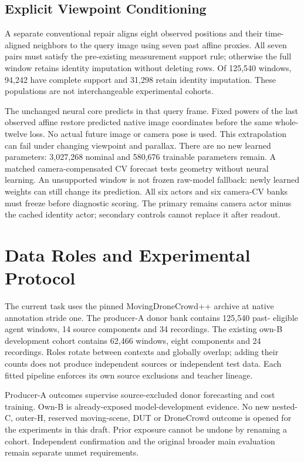 \documentclass[10pt,twocolumn,letterpaper]{article}
\begin{document}
\subsection{Explicit Viewpoint Conditioning}

A separate conventional repair aligns eight observed positions and their time-aligned neighbors to the query image using seven past affine proxies. All seven pairs must satisfy the pre-existing measurement support rule; otherwise the full window retains identity imputation without deleting rows. Of 125,540 windows, 94,242 have complete support and 31,298 retain identity imputation. These populations are not interchangeable experimental cohorts.


The unchanged neural core predicts in that query frame. Fixed powers of the last observed affine restore predicted native image coordinates before the same whole-twelve loss. No actual future image or camera pose is used. This extrapolation can fail under changing viewpoint and parallax. There are no new learned parameters: 3,027,268 nominal and 580,676 trainable parameters remain. A matched camera-compensated CV forecast tests geometry without neural learning. An unsupported window is not frozen raw-model fallback: newly learned weights can still change its prediction. All six actors and six camera-CV banks must freeze before diagnostic scoring. The primary remains camera actor minus the cached identity actor; secondary controls cannot replace it after readout.


\section{Data Roles and Experimental Protocol}

The current task uses the pinned MovingDroneCrowd++ archive at native annotation stride one. The producer-A donor bank contains 125,540 past- eligible agent windows, 14 source components and 34 recordings. The existing own-B development cohort contains 62,466 windows, eight components and 24 recordings. Roles rotate between contexts and globally overlap; adding their counts does not produce independent sources or independent test data. Each fitted pipeline enforces its own source exclusions and teacher lineage.


Producer-A outcomes supervise source-excluded donor forecasting and cost training. Own-B is already-exposed model-development evidence. No new nested-C, outer-H, reserved moving-scene, DUT or DroneCrowd outcome is opened for the experiments in this draft. Prior exposure cannot be undone by renaming a cohort. Independent confirmation and the original broader main evaluation remain separate unmet requirements.
\end{document}
